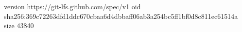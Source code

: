 version https://git-lfs.github.com/spec/v1
oid sha256:369c72263dfd1ddc670cbaa6d4dbbaff06ab3a254bc5ff1bf0d8c811ec61514a
size 43840
